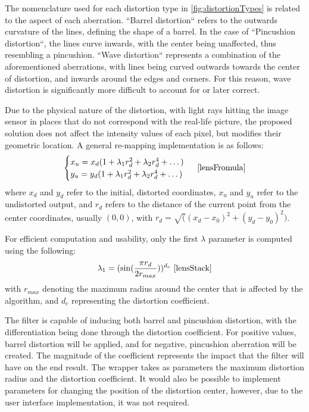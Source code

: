 The nomenclature used for each distortion type in \cref{fig:distortionTypes} is related to the aspect of each
aberration. ``Barrel distortion`` refers to the outwards curvature of the lines, defining the shape of a
barrel. In the case of ``Pincushion distortion``, the lines curve inwards, with the center being unaffected,
thus resembling a pincushion. ``Wave distortion`` represents a combination of the aforementioned aberrations,
with lines being curved outwards towards the center of distortion, and inwards around the edges and corners.
For this reason, wave distortion is significantly more difficult to account for or later correct.

Due to the physical nature of the distortion, with light rays hitting the image sensor in places that do not
correspond with the real-life picture, the proposed solution does not affect the intensity values of each
pixel, but modifies their geometric location. A general re-mapping implementation is as follows:
\begin{equation}
    \label{eq:lensFormula}
    \begin{cases}
        x_u = x_d(1 + \lambda_1r_d^2 + \lambda_2r_d^4 + \dots) \\
        y_u = y_d(1 + \lambda_1r_d^2 + \lambda_2r_d^4 + \dots) \\
    \end{cases}
    \text{ \cite{lensFromula}}
\end{equation}
where \(x_d\) and \(y_d\) refer to the initial, distorted coordinates, \(x_u\) and \(y_u\) refer to the 
undistorted output, and \(r_d\) refers to the distance of the current point from the center coordinates,
usually \((0, 0)\), with \(r_d = \sqrt((x_d - x_0)^2 + (y_d - y_0)^2)\).

For efficient computation and usability, only the first \(\lambda\) parameter is computed using the following:
\begin{equation}
    \label{eq:lensLambda}
    \lambda_1 = (\sin({{\pi r_d}\over{2 r_{max}}}))^{d_c}
    \text{ \cite{lensStack}}
\end{equation}
with \(r_{max}\) denoting the maximum radius around the center that is affected by the algorithm, and \(d_c\)
representing the distortion coefficient.

The filter is capable of inducing both barrel and pincushion distortion, with the differentiation being done
through the distortion coefficient. For positive values, barrel distortion will be applied, and for negative,
pincushion aberration will be created. The magnitude of the coefficient represents the impact that the filter
will have on the end result. The wrapper takes as parameters the maximum distortion radius and the distortion
coefficient. It would also be possible to implement parameters for changing the position of the distortion
center, however, due to the user interface implementation, it was not required.

